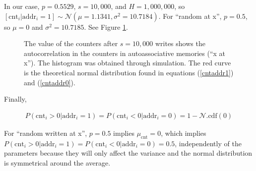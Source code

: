 In our case, $p=0.5529$, $s=10,000$, and $H=1,000,000$, so $[\text{cnt}_i | \text{addr}_i=1] \sim \mathcal{N}(\mu=1.1341, \sigma^2 = 10.7184)$. For ``random at x'', $p=0.5$, so $\mu = 0$ and $\sigma^2 = 10.7185$. See Figure \ref{fig:sdm-corr-counters}.

\begin{figure}[h!]
  \centering

  \caption{The value of the counters after $s=10,000$ writes shows the autocorrelation in the counters in autoassociative memories (``x at x''). The histogram was obtained through simulation. The red curve is the theoretical normal distribution found in equations (\ref{cntaddr1}) and (\ref{cntaddr0}).}
  \label{fig:sdm-corr-counters}
\end{figure}


Finally,

\begin{align}
P(\text{cnt}_i > 0 | \text{addr}_i = 1) = P(\text{cnt}_i < 0 | \text{addr}_i = 0) = 1 - \mathcal{N}.\text{cdf}(0)
\end{align}

For ``random written at x'', $p=0.5$ implies $\mu_\text{cnt} = 0$, which implies $P(\text{cnt}_i > 0 | \text{addr}_i = 1) = P(\text{cnt}_i < 0 | \text{addr}_i = 0) = 0.5$, independently of the parameters because they will only affect the variance and the normal distribution is symmetrical around the average.

